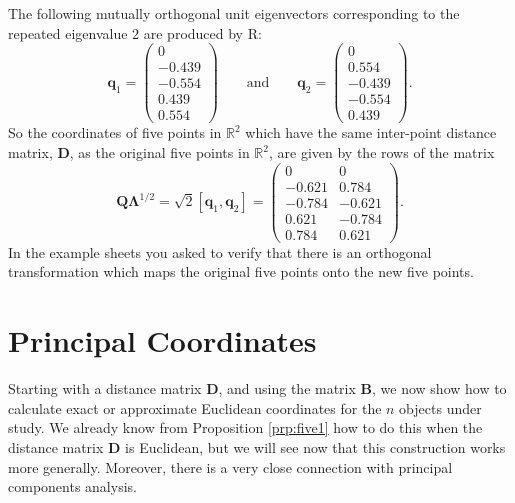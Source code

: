\documentclass[]{book}
\theoremstyle{definition}
\theoremstyle{definition}
\theoremstyle{definition}
\theoremstyle{remark}
\begin{document}
The following mutually orthogonal unit eigenvectors corresponding to the repeated eigenvalue \(2\)
are produced by R:
\[
\boldsymbol q_1= \begin{pmatrix}0 \\ -0.439 \\ -0.554 \\ 0.439 \\ 0.554 \end{pmatrix} \qquad
\text{and} \qquad \boldsymbol q_2 =\begin{pmatrix}0 \\ 0.554 \\ -0.439 \\ -0.554\\ 0.439 \end{pmatrix}.
\]
So the coordinates of five points in \(\mathbb{R}^2\) which have the same inter-point distance matrix, \(\boldsymbol D\), as the original five points in \(\mathbb{R}^2\), are given by the rows of the matrix
\[
\boldsymbol Q\boldsymbol \Lambda^{1/2}=\sqrt{2}[\boldsymbol q_1 , \boldsymbol q_2]=
\begin{pmatrix}
0&0\\
-0.621 & 0.784\\
-0.784 & -0.621\\
0.621 & -0.784\\
0.784 & 0.621
\end{pmatrix}.
\]
In the example sheets you asked to verify that there is an orthogonal transformation which maps the original five points onto the new five points.

\hypertarget{principal-coordinates}{%
\section{Principal Coordinates}\label{principal-coordinates}}

Starting with a distance matrix \(\boldsymbol D\), and using the matrix \(\boldsymbol B\), we now show how to calculate exact or approximate Euclidean coordinates for the \(n\) objects under study. We already know from Proposition \ref{prp:five1} how to do this when the distance matrix \(\boldsymbol D\) is Euclidean, but we will see now that this construction works more generally. Moreover, there is a very close connection with principal components analysis.
\end{document}
